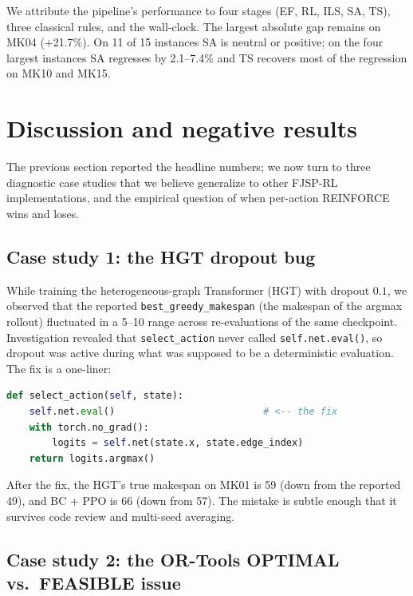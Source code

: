 \documentclass[preprint,review,3p,times,twocolumn]{elsarticle}
\begin{document}
We attribute the pipeline's performance to four stages
(EF, RL, ILS, SA, TS), three classical rules, and the
wall-clock. The largest absolute gap remains on MK04
(+21.7\%). On 11 of 15 instances SA is neutral or
positive; on the four largest instances SA regresses by
2.1--7.4\% and TS recovers most of the regression on
MK10 and MK15.

\section{Discussion and negative results}
\label{sec:discussion}

The previous section reported the headline numbers; we
now turn to three diagnostic case studies that we believe
generalize to other FJSP-RL implementations, and the
empirical question of when per-action REINFORCE wins and
loses.

\subsection{Case study 1: the HGT dropout bug}
\label{sec:lessons-hgt}

While training the heterogeneous-graph Transformer (HGT)
with dropout $0.1$, we observed that the reported
\texttt{best\_greedy\_makespan} (the makespan of the
argmax rollout) fluctuated in a 5--10 range across
re-evaluations of the same checkpoint. Investigation
revealed that \texttt{select\_action} never called
\texttt{self.net.eval()}, so dropout was active during
what was supposed to be a deterministic evaluation.
The fix is a one-liner:
\begin{lstlisting}[language=python,
  basicstyle=\ttfamily\footnotesize]
def select_action(self, state):
    self.net.eval()                          # <-- the fix
    with torch.no_grad():
        logits = self.net(state.x, state.edge_index)
    return logits.argmax()
\end{lstlisting}
After the fix, the HGT's true makespan on MK01 is 59
(down from the reported 49), and BC + PPO is 66 (down
from 57). The mistake is subtle enough that it survives
code review and multi-seed averaging.

\subsection{Case study 2: the OR-Tools OPTIMAL vs.\ FEASIBLE issue}
\label{sec:lessons-ortools}
\end{document}
